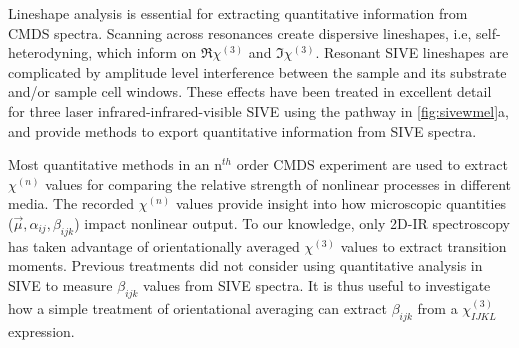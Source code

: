 \documentclass[aip, jcp, reprint, twocolumn]{revtex4-2}
\begin{document}
Lineshape analysis is essential for extracting quantitative information from CMDS spectra.
Scanning across resonances create dispersive lineshapes, i.e, self-heterodyning, which inform on $\Re{\chi^{(3)}}$ and $\Im{\chi^{(3)}}$.\cite{Levenson1974_1, Levenson1974_2}
Resonant SIVE lineshapes are complicated by amplitude level interference between the sample and its substrate and/or sample cell windows. \cite{RN362}
These effects have been treated in excellent detail for three laser infrared-infrared-visible SIVE using the pathway in \autoref{fig:sivewmel}a, and provide methods to export quantitative information from SIVE spectra. \cite{RN418}

Most quantitative methods in an n$^{th}$ order CMDS experiment are used to extract $\chi^{(n)}$ values for comparing the relative strength of nonlinear processes in different media. \cite{Zhu87, RN351, RN345}
The recorded $\chi^{(n)}$ values provide insight into how microscopic quantities ($\vec{\mu}, \alpha_{ij}, \beta_{ijk}$) impact nonlinear output.
To our knowledge, only 2D-IR spectroscopy has taken advantage of orientationally averaged $\chi^{(3)}$ values to extract transition moments. \cite{Moilanen2009, Grechko2012}
Previous treatments did not consider using quantitative analysis in SIVE to measure $\beta_{ijk}$ values from SIVE spectra.
It is thus useful to investigate how a simple treatment of orientational averaging can extract $\beta_{ijk}$ from a $\chi^{(3)}_{IJKL}$ expression.
\end{document}
